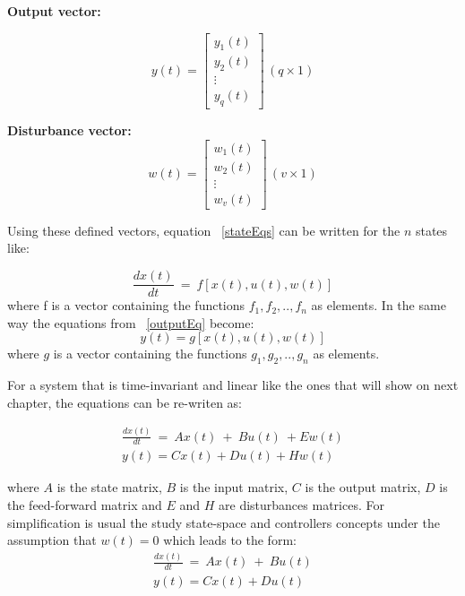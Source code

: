  \textbf{ Output vector:}
 
   \begin{equation}
y(t)=
 \left[
 \begin{matrix}
 y_1(t)\\
 y_2(t)\\
 \vdots\\
 y_q(t)
 \end{matrix}
 \right] \, (q\times 1)
 \end{equation}
 
\textbf{ Disturbance vector:}
    \begin{equation}
 w(t)=
 \left[
 \begin{matrix}
 w_1(t)\\
 w_2(t)\\
 \vdots\\
 w_v(t)
 \end{matrix}
 \right] \, (v\times 1)
 \end{equation}
 
 Using these defined vectors, equation ~\ref{stateEqs} can be written for the $n$ states like:\smallskip
 
 \begin{equation}
 	\frac{dx(t)}{dt}~=~ f[x(t),u(t),w(t)]
 \end{equation} 
 where f is a vector containing the functions $f_1,f_2,..,f_n$ as elements. In the same way the equations from ~\ref{outputEq} become:
 \begin{equation}
 	y(t)=g[x(t),u(t),w(t)]
 \end{equation}
 where $g$ is a vector containing the functions $g_1,g_2,..,g_n$ as elements.
 
 For a system that is time-invariant and linear like the ones that will show on next chapter, the equations can be re-writen as:
 
 \begin{align}
	\frac{dx(t)}{dt}~=~ Ax(t)~+~Bu(t)~+Ew(t) \\
	y(t)=Cx(t)+Du(t)+Hw(t)
 \end{align}

  where $A$ is the state matrix, $B$ is the input matrix, $C$ is the output matrix, $D$ is the feed-forward matrix and  $E$ and $H$ are disturbances matrices. For simplification is usual the study state-space and controllers concepts under the assumption that $w(t) =0$ which leads to the form:
 \smallskip
 \begin{align}
 	 \frac{dx(t)}{dt}~=~ Ax(t)~+~Bu(t)\\
 	  y(t)=Cx(t)+Du(t)
 	  \label{SS_eqs}
 \end{align}


